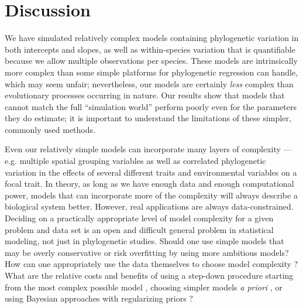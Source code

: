 \documentclass[12pt]{article}
\begin{document}

\section*{Discussion}



We have simulated relatively complex models containing phylogenetic variation in both intercepts and slopes, as well as within-species variation that is quantifiable because we allow multiple observations per species.
These models are intrinsically more complex than some simple platforms for phylogenetic regression can handle, which may seem unfair; nevertheless, our models are certainly \emph{less} complex than evolutionary processes occurring in nature.
Our results show that models that cannot match the full ``simulation world'' perform poorly even for the parameters they do estimate; it is important to understand the limitations of these simpler, commonly used methods.

Even our relatively simple models can incorporate many layers of complexity --- e.g. multiple spatial grouping variables as well as correlated phylogenetic variation in the effects of several different traits and environmental variables on a focal trait.
In theory, as long as we have enough data and enough computational power, models that can incorporate more of the complexity will always describe a biological system better.
However, real applications are always data-constrained.
Deciding on a practically appropriate level of model complexity for a given
problem and data set is an
open and difficult general problem in statistical modeling, not just
in phylogenetic studies.
Should one use simple models that may be overly conservative or
risk overfitting by using more ambitious models?
How can one appropriately use the data themselves
to choose model complexity \citep{roberts_cross-validation_2016}?
What are the relative costs and benefits of using a step-down procedure
starting from the most complex possible model \citep{barr2013random},
choosing simpler models \emph{a priori} \citep{baayen2008mixed},
or using Bayesian approaches with regularizing priors \citep{hadfield2010mcmc}?
\end{document}
